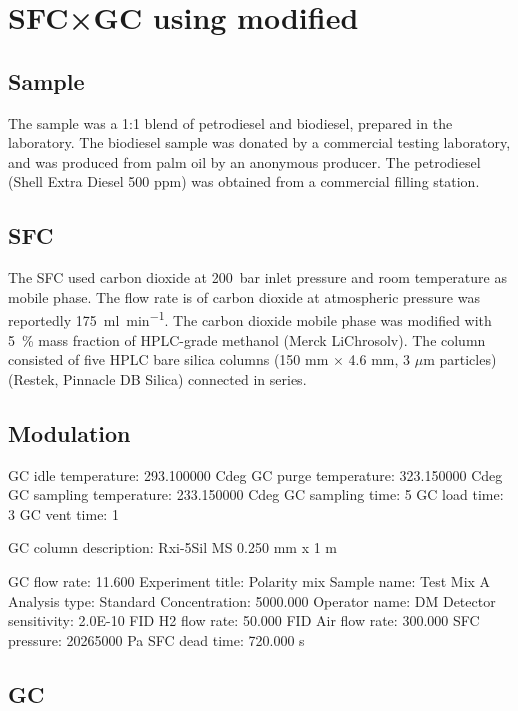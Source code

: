 \section[SFC×GC ]{SFC×GC using modified}

\subsection{Sample}

The sample was a 1:1 blend of petrodiesel and biodiesel, prepared in the
laboratory. The biodiesel sample was donated by a commercial testing laboratory,
and was produced from palm oil by an anonymous producer. The petrodiesel (Shell
Extra Diesel 500 ppm) was obtained from a commercial filling station.


\subsection{SFC}

The SFC used carbon dioxide at \SI{200}{\bar} inlet pressure and room
temperature as mobile phase. The flow rate is of carbon dioxide at atmospheric
pressure was reportedly \SI{175}{\milli\litre\per\minute}. The carbon dioxide
mobile phase was modified with \SI{5}{\percent} mass fraction of HPLC-grade
methanol (Merck LiChrosolv). The column consisted of five HPLC bare silica
columns (150 mm $\times$ 4.6 mm, 3 $\mu$m particles) (Restek, Pinnacle DB
Silica) connected in series.

\subsection{Modulation}

GC idle temperature:	293.100000 Cdeg
GC purge temperature: 	323.150000 Cdeg
GC sampling temperature: 	233.150000 Cdeg
GC sampling time: 	5
GC load time: 	3
GC vent time: 	1

GC column description:	Rxi-5Sil MS 0.250 mm x 1 m

GC flow rate: 	11.600
Experiment title: 	Polarity mix
Sample name: 	Test Mix A
Analysis type: 	Standard
Concentration: 	5000.000
Operator name: 	DM
Detector sensitivity: 	2.0E-10
FID H2 flow rate: 	50.000
FID Air flow rate: 	300.000
SFC pressure: 	20265000 Pa
SFC dead time: 	720.000 s


\subsection{GC}

